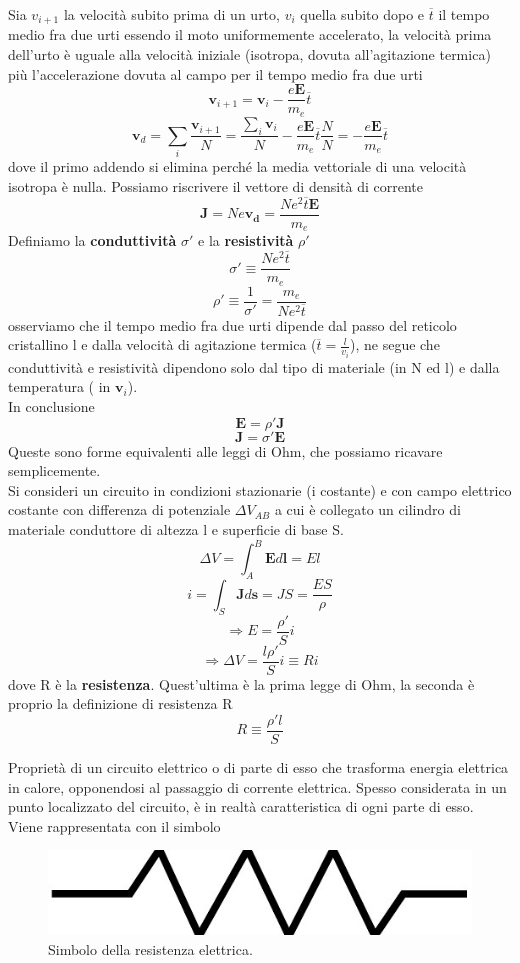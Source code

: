 \documentclass[
10pt, %
a4paper, %
oneside, %
headinclude,footinclude, %
BCOR5mm, %
]{scrartcl}
\begin{document}
Sia \(v_{i+1}\) la velocità subito prima di un urto, \(v_i\) quella subito dopo e $\overline{t}$ il tempo medio fra due urti essendo il moto uniformemente accelerato, la velocità prima dell'urto è uguale alla velocità iniziale (isotropa, dovuta all'agitazione termica) più l'accelerazione dovuta al campo per il tempo medio fra due urti
\[\mathbf{v}_{i+1}  = \mathbf{v}_i - \frac{e\mathbf{E}}{m_e}\overline{t}\]
\[\mathbf{v}_d = \sum_i\frac{\mathbf{v}_{i+1}}{N}= \frac{\sum_i\mathbf{v}_i}{N} - \frac{e\mathbf{E}}{m_e}\overline{t} \frac{N}{N} = - \frac{e\mathbf{E}}{m_e}\overline{t}\]
dove il primo addendo si elimina perché la media vettoriale di una velocità isotropa è nulla. Possiamo riscrivere il vettore di densità di corrente
\[\mathbf{J}= Ne\mathbf{v_d}= \frac{Ne^2\overline{t}\mathbf{E}}{m_e}\]
Definiamo la \textbf{conduttività} $\sigma'$ e la \textbf{resistività} $\rho'$
\[\sigma' \equiv \frac{Ne^2\overline{t}}{m_e}\]
\[\rho' \equiv \frac{1}{\sigma'}= \frac{m_e}{Ne^2\overline{t}}\]
osserviamo che il tempo medio fra due urti dipende dal passo del reticolo cristallino l e dalla velocità di agitazione termica (\(\overline{t}= \frac{l}{v_i}\)), ne segue che conduttività e resistività dipendono solo dal tipo di materiale (in N ed l) e dalla temperatura ( in $\mathbf{v}_i$). \\
In conclusione
\[\mathbf{E}= \rho' \mathbf{J}\]
\[\mathbf{J}= \sigma' \mathbf{E}\]
Queste sono forme equivalenti alle leggi di Ohm, che possiamo ricavare semplicemente.\\
Si consideri un circuito in condizioni stazionarie (i costante) e con campo elettrico costante con differenza di potenziale \(\Delta V_{AB}\) a cui è collegato un cilindro di materiale conduttore di altezza l e superficie di base S. 
\[\Delta V = \int_{A}^{B}\mathbf{E}d\mathbf{l}=El\]
\[i = \int_S \mathbf{J}d\mathbf{s}= JS= \frac{E S}{\rho}\]
\[\Rightarrow E = \frac{\rho'}{S}i\]
\[\Rightarrow \Delta V = \frac{l\rho'}{S}i \equiv R i\]
dove R è la \textbf{resistenza}. Quest'ultima è la prima legge di Ohm, la seconda è proprio la definizione di resistenza R
\[R \equiv \frac{\rho' l}{S}\]
\begin{definizione}[Resistenza]
Proprietà di un circuito elettrico o di parte di esso che trasforma energia elettrica in calore, opponendosi al passaggio di corrente elettrica. Spesso considerata in un punto localizzato del circuito, è in realtà caratteristica di ogni parte di esso. Viene rappresentata con il simbolo
\begin{figure}[h!]
	\centering
	\includegraphics[width=0.3\linewidth]{../images/resistenza}
	\caption{Simbolo della resistenza elettrica.}
	\label{fig:resistenza}
\end{figure}
\FloatBarrier
\end{definizione}
\end{document}

